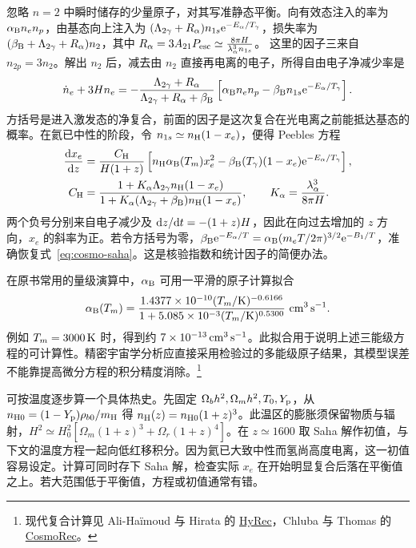忽略 $n=2$ 中瞬时储存的少量原子，对其写准静态平衡。向有效态注入的率为 $\alpha_{\rm B}n_e n_p$，由基态向上注入为 $(\Lambda_{2\gamma}+R_\alpha)n_{1s}\mathrm{e}^{-E_\alpha/T_\gamma}$，损失率为 $(\beta_{\rm B}+\Lambda_{2\gamma}+R_\alpha)n_2$，其中 $R_\alpha=3A_{21}P_{\rm esc}\simeq\frac{8\pi H}{\lambda_\alpha^3 n_{1s}}$。
这里的因子三来自 $n_{2p}=3n_2$。解出 $n_2$ 后，减去由 $n_2$ 直接再电离的电子，所得自由电子净减少率是
\[
 \dot n_e+3Hn_e=
 -\frac{\Lambda_{2\gamma}+R_\alpha}
 {\Lambda_{2\gamma}+R_\alpha+\beta_{\rm B}}
 \left[\alpha_{\rm B}n_e n_p-\beta_{\rm B}n_{1s}
                    \mathrm{e}^{-E_\alpha/T_\gamma}\right] .
\]
方括号是进入激发态的净复合，前面的因子是这次复合在光电离之前能抵达基态的概率。在氦已中性的阶段，令 $n_{1s}\simeq n_{\rm H}(1-x_e)$，便得 Peebles 方程
\begin{equation}\label{eq:cosmo-peebles}
 \begin{aligned}
 \frac{\dd x_e}{\dd z}&=
 \frac{C_{\rm H}}{H(1+z)}
 \left[n_{\rm H}\alpha_{\rm B}(T_m)x_e^2
 -\beta_{\rm B}(T_\gamma)(1-x_e)\mathrm{e}^{-E_\alpha/T_\gamma}\right],\\
 C_{\rm H}&=\frac{1+K_\alpha\Lambda_{2\gamma}n_{\rm H}(1-x_e)}
 {1+K_\alpha(\Lambda_{2\gamma}+\beta_{\rm B})n_{\rm H}(1-x_e)},\qquad
 K_\alpha=\frac{\lambda_\alpha^3}{8\pi H}.
 \end{aligned}
\end{equation}
两个负号分别来自电子减少及 $\dd z/\dd t=-(1+z)H$，因此在向过去增加的 $z$ 方向，$x_e$ 的斜率为正。若令方括号为零，$\beta_{\rm B}\mathrm{e}^{-E_\alpha/T}=\alpha_{\rm B}(m_eT/2\pi)^{3/2}\mathrm{e}^{-B_1/T}$，准确恢复式~\eqref{eq:cosmo-saha}。这是核验指数和统计因子的简便办法。

在原书常用的量级演算中，$\alpha_{\rm B}$ 可用一平滑的原子计算拟合
\[
 \alpha_{\rm B}(T_m)=
 \frac{1.4377\times10^{-10}(T_m/{\rm K})^{-0.6166}}
 {1+5.085\times10^{-3}(T_m/{\rm K})^{0.5300}}
 \ {\rm cm^3\,s^{-1}} .
\]
例如 $T_m=3000\,{\rm K}$ 时，得到约 $7\times10^{-13}\,{\rm cm^3\,s^{-1}}$。此拟合用于说明上述三能级方程的可计算性。精密宇宙学分析应直接采用检验过的多能级原子结果，其模型误差不能靠提高微分方程的积分精度消除。\footnote{现代复合计算见 Ali-Haïmoud 与 Hirata 的 \href{https://arxiv.org/abs/1011.3758}{HyRec}，Chluba 与 Thomas 的 \href{https://arxiv.org/abs/1010.3631}{CosmoRec}。}

可按温度逐步算一个具体热史。先固定 $\Omega_bh^2,\Omega_mh^2,T_0,Y_{\rm p}$，从 $n_{{\rm H}0}=(1-Y_{\rm p})\rho_{b0}/m_{\rm H}$ 得 $n_{\rm H}(z)=n_{{\rm H}0}(1+z)^3$。此温区的膨胀须保留物质与辐射，$H^2\simeq H_0^2[\Omega_m(1+z)^3+\Omega_r(1+z)^4]$。在 $z\simeq1600$ 取 Saha 解作初值，与下文的温度方程一起向低红移积分。因为氦已大致中性而氢尚高度电离，这一初值容易设定。计算可同时存下 Saha 解，检查实际 $x_e$ 在开始明显复合后落在平衡值之上。若大范围低于平衡值，方程或初值通常有错。

